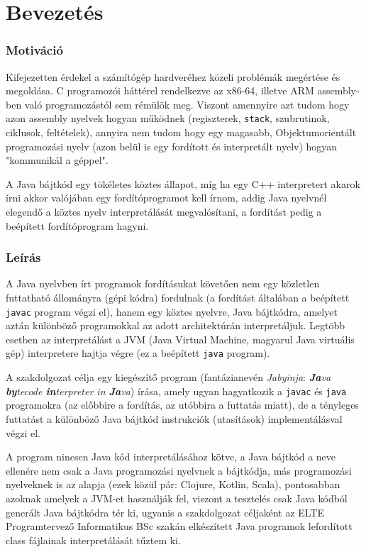 \chapter{Bevezetés}
\label{ch:intro}

\subsection{Motiváció}

Kifejezetten érdekel a számítógép hardveréhez közeli problémák megértése és megoldása. C programozói háttérel rendelkezve az x86-64, illetve ARM assembly-ben való programozástól sem rémülök meg. Viszont amennyire azt tudom hogy azon assembly nyelvek hogyan működnek (regiszterek, \lstinline{stack}, szubrutinok, ciklusok, feltételek), annyira nem tudom hogy egy magasabb, Objektumorientált programozási nyelv (azon belül is egy fordított és interpretált nyelv) hogyan "kommunikál a géppel".

A Java bájtkód egy tökéletes köztes állapot, míg ha egy C++ interpretert akarok írni akkor valójában egy fordítóprogramot kell írnom, addig Java nyelvnél elegendő a köztes nyelv interpretálását megvalósítani, a fordítást pedig a beépített fordítóprogram hagyni.

\subsection{Leírás}

A Java nyelvben írt programok fordításukat követően nem egy közletlen futtatható állományra (gépi kódra) fordulnak (a fordítást általában a beépített \lstinline{javac} program végzi el), hanem egy köztes nyelvre, Java bájtkódra, amelyet aztán különböző programokkal az adott architektúrán interpretáljuk. Legtöbb esetben az interpretálást a JVM (Java Virtual Machine, magyarul Java virtuális gép) interpretere hajtja végre (ez a beépített \lstinline{java} program).

A szakdolgozat célja egy kiegészítő program (fantázianevén \textit{Jabyinja}: \textit{\textbf{Ja}va \textbf{by}tecode \textbf{in}terpreter in \textbf{Ja}va}) írása, amely ugyan hagyatkozik a \lstinline{javac} és \lstinline{java} programokra (az előbbire a fordítás, az utóbbira a futtatás miatt), de a tényleges futtatást a különböző Java bájtkód instrukciók (utasítások) implementálásval végzi el.

A program nincsen Java kód interpretálásához kötve, a Java bájtkód a neve ellenére nem csak a Java programozási nyelvnek a bájtkódja, más programozási nyelveknek is az alapja (ezek közül pár: Clojure, Kotlin, Scala), pontosabban azoknak amelyek a JVM-et használják fel, viszont a tesztelés csak Java kódból generált Java bájtkódra tér ki, ugyanis a szakdolgozat céljaként az ELTE Programtervező Informatikus BSc szakán elkészített Java programok lefordított class fájlainak interpretálását tűztem ki.

